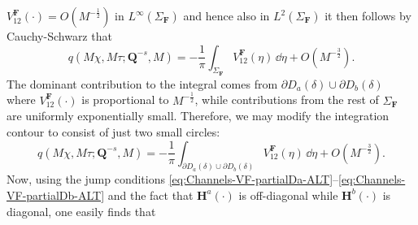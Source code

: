 $V_{12}^\mathbf{F}(\cdot)=O(M^{-\frac{1}{2}})$
in $L^\infty(\Sigma_\mathbf{F})$ and hence also in $L^2(\Sigma_\mathbf{F})$ it then follows by Cauchy-Schwarz that
\begin{equation}
q(M\chi,M\tau;\mathbf{Q}^{-s},M)=-\frac{1}{\pi}\int_{\Sigma_\mathbf{F}}V^\mathbf{F}_{12}(\eta)\,\dd\eta + O(M^{-\frac{3}{2}}).
\end{equation}
The dominant contribution to the integral comes from $\partial D_a(\delta)\cup\partial D_b(\delta)$ where $V^\mathbf{F}_{12}(\cdot)$ is proportional to 
$M^{-\frac{1}{2}}$,
while contributions from the rest of $\Sigma_\mathbf{F}$ are uniformly exponentially small.  Therefore, we may modify the integration contour to consist of just two small circles:
\begin{equation}
q(M\chi,M\tau;\mathbf{Q}^{-s},M)=-\frac{1}{\pi}\int_{\partial D_a(\delta)\cup\partial D_b(\delta)}V^\mathbf{F}_{12}(\eta)\,\dd\eta + O(M^{-\frac{3}{2}}).
\end{equation}
Now, using the jump conditions \eqref{eq:Channels-VF-partialDa-ALT}--\eqref{eq:Channels-VF-partialDb-ALT} and the fact that $\mathbf{H}^a(\cdot)$ is off-diagonal while $\mathbf{H}^b(\cdot)$ is diagonal, one easily finds that
